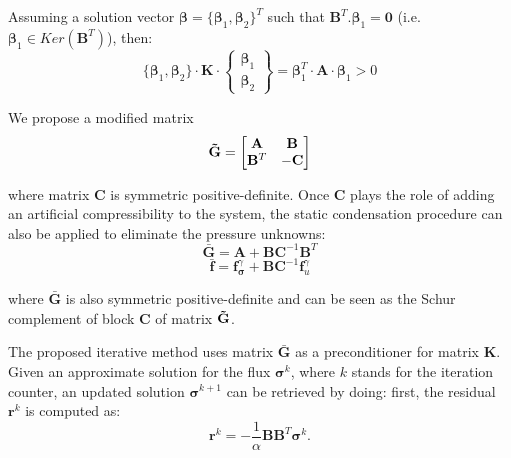 \documentclass{wccm2024}
\begin{document}
Assuming a solution vector $\boldsymbol{\beta}=\{\boldsymbol{\beta}_1, \boldsymbol{\beta}_2\}^T$ such that $\mathbf{B}^T . \boldsymbol{\beta}_1 = \mathbf{0}$ (i.e. $\boldsymbol{\beta}_1 \in Ker\left( \mathbf{B}^T \right)$), then:
\vskip -0.3cm
\begin{equation}
    \{\boldsymbol{\beta}_1, \boldsymbol{\beta}_2\} \cdot \mathbf{K} \cdot 
    \begin{Bmatrix}
        \boldsymbol{\beta}_1 \\
        \boldsymbol{\beta}_2
    \end{Bmatrix}
    = \boldsymbol{\beta}_1^T \cdot \mathbf{A} \cdot \boldsymbol{\beta}_1 > 0
\end{equation}

We propose a modified matrix
\vskip -0.3cm
\begin{equation}
    \mathbf{\Tilde{G}} =
    \begin{bmatrix}
        \mathbf{A} & \mathbf{B} \\
        \mathbf{B}^T & -\mathbf{C}
    \end{bmatrix}
\end{equation}

\noindent where matrix $\mathbf{C}$ is symmetric positive-definite. Once $\mathbf{C}$ plays the role of adding an artificial compressibility to the system, the static condensation procedure can also be applied to eliminate the pressure unknowns:
\vskip -0.3cm
\begin{equation}
    \bar{\mathbf{G}} = \mathbf{A} + \mathbf{B}\mathbf{C}^{-1}\mathbf{B}^T
\end{equation}
\vskip -0.3cm
\begin{equation}
    \bar{\mathbf{f}} = \mathbf{f}^\gamma_{\boldsymbol{\sigma}} + \mathbf{B}\mathbf{C}^{-1}\mathbf{f}^\gamma_{u}
\end{equation}

\noindent where $\bar{\mathbf{G}}$ is also symmetric positive-definite and can be seen as the Schur complement of block $\mathbf{C}$ of matrix $\mathbf{\Tilde{G}}$. 

The proposed iterative method uses matrix $\bar{\mathbf{G}}$ as a preconditioner for matrix $\mathbf{K}$. Given an approximate solution for the flux $\boldsymbol{\sigma}^k$, where $k$ stands for the iteration counter, an updated solution $\boldsymbol{\sigma}^{k+1}$ can be retrieved by doing: first, the residual $\mathbf{r}^{k}$ is computed as:
\vskip -0.3cm
\begin{equation}
    \mathbf{r}^{k} = - \frac{1}{\alpha}\mathbf{B}\mathbf{B}^T \boldsymbol{\sigma}^k .
\end{equation}
\end{document}

